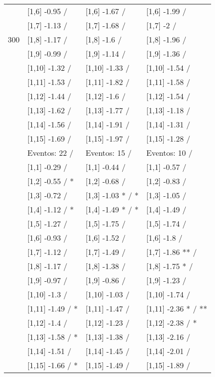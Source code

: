 \begin{table}
\begin{tabular}[t]{llll}
 & {}[1,6] -0.95  / & {}[1,6] -1.67  / & {}[1,6] -1.99  /\\
 & {}[1,7] -1.13  / & {}[1,7] -1.68  / & {}[1,7] -2  /\\
300 & {}[1,8] -1.17  / & {}[1,8] -1.6  / & {}[1,8] -1.96  /\\
\addlinespace
 & {}[1,9] -0.99  / & {}[1,9] -1.14  / & {}[1,9] -1.36  /\\
 & {}[1,10] -1.32  / & {}[1,10] -1.33  / & {}[1,10] -1.54  /\\
 & {}[1,11] -1.53  / & {}[1,11] -1.82  / & {}[1,11] -1.58  /\\
 & {}[1,12] -1.44  / & {}[1,12] -1.6  / & {}[1,12] -1.54  /\\
 & {}[1,13] -1.62  / & {}[1,13] -1.77  / & {}[1,13] -1.18  /\\
\addlinespace
 & {}[1,14] -1.56  / & {}[1,14] -1.91  / & {}[1,14] -1.31  /\\
 & {}[1,15] -1.69  / & {}[1,15] -1.97  / & {}[1,15] -1.28  /\\
 & Eventos:  22 / & Eventos:  15 / & Eventos:  10 /\\
 & {}[1,1] -0.29  / & {}[1,1] -0.44  / & {}[1,1] -0.57  /\\
 & {}[1,2] -0.55  / * & {}[1,2] -0.68  / & {}[1,2] -0.83  /\\
\addlinespace
 & {}[1,3] -0.72  / & {}[1,3] -1.03 * / * & {}[1,3] -1.05  /\\
 & {}[1,4] -1.12  / * & {}[1,4] -1.49 * / * & {}[1,4] -1.49  /\\
 & {}[1,5] -1.27  / & {}[1,5] -1.75  / & {}[1,5] -1.74  /\\
 & {}[1,6] -0.93  / & {}[1,6] -1.52  / & {}[1,6] -1.8  /\\
 & {}[1,7] -1.12  / & {}[1,7] -1.49  / & {}[1,7] -1.86 ** /\\
\addlinespace
500 & {}[1,8] -1.17  / & {}[1,8] -1.38  / & {}[1,8] -1.75 * /\\
 & {}[1,9] -0.97  / & {}[1,9] -0.86  / & {}[1,9] -1.23  /\\
 & {}[1,10] -1.3  / & {}[1,10] -1.03  / & {}[1,10] -1.74  /\\
 & {}[1,11] -1.49  / * & {}[1,11] -1.47  / & {}[1,11] -2.36 * / **\\
 & {}[1,12] -1.4  / & {}[1,12] -1.23  / & {}[1,12] -2.38  / *\\
\addlinespace
 & {}[1,13] -1.58  / * & {}[1,13] -1.38  / & {}[1,13] -2.16  /\\
 & {}[1,14] -1.51  / & {}[1,14] -1.45  / & {}[1,14] -2.01  /\\
 & {}[1,15] -1.66  / * & {}[1,15] -1.49  / & {}[1,15] -1.89  /\\
\bottomrule
\end{tabular}
\end{table}
